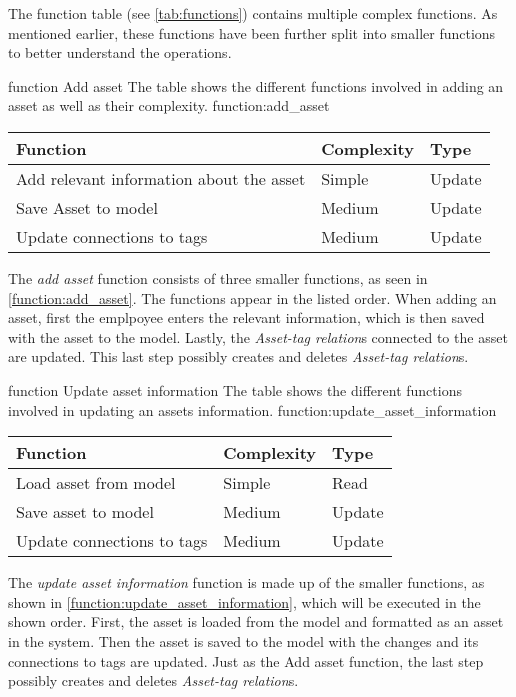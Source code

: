 The function table (see \autoref{tab:functions}) contains multiple complex functions. As mentioned earlier, these functions have been further split into smaller functions to better understand the operations. 


\fancyLayout
    {function}
    {Add asset}
    {The table shows the different functions involved in adding an asset as well as their complexity.}
    {function:add_asset}
    {
        \centering
        \begin{tabular}{|l|l|l|}
            \hline
            \textbf{Function} & \textbf{Complexity} & \textbf{Type}\\
            \hline
            \hline
            Add relevant information about the asset & Simple & Update \\
            \hline
            Save Asset to model & Medium & Update \\
            \hline
            Update connections to tags & Medium & Update\\
            \hline
        \end{tabular}
}

The \textit{add asset} function consists of three smaller functions, as seen in \autoref{function:add_asset}. The functions appear in the listed order. When adding an asset, first the emplpoyee enters the relevant information, which is then saved with the asset to the model. Lastly, the \textit{Asset-tag relation}s connected to the asset are updated. This last step possibly creates and deletes \textit{Asset-tag relation}s.

\fancyLayout
    {function}
    {Update asset information}
    {The table shows the different functions involved in updating an assets information.}
    {function:update_asset_information}
    {
        \centering
        \begin{tabular}{|l|l|l|}
            \hline
            \textbf{Function} & \textbf{Complexity} & \textbf{Type}\\
            \hline
            \hline
            Load asset from model & Simple & Read \\
            \hline
            Save asset to model & Medium & Update \\
            \hline
            Update connections to tags & Medium & Update\\
            \hline
        \end{tabular}
}

The \textit{update asset information} function is made up of the smaller functions, as shown in \autoref{function:update_asset_information}, which will be executed in the shown order. First, the asset is loaded from the model and formatted as an asset in the system. Then the asset is saved to the model with the changes and its connections to tags are updated. Just as the Add asset function, the last step possibly creates and deletes \textit{Asset-tag relation}s.


